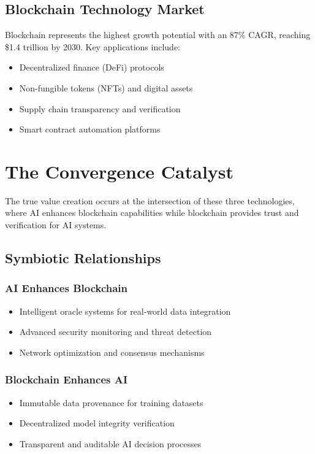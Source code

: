 \documentclass[11pt,a4paper]{report}
\begin{document}
\section{Blockchain Technology Market}

Blockchain represents the highest growth potential with an 87\% CAGR, reaching \$1.4 trillion by 2030. Key applications include:

\begin{itemize}
\item Decentralized finance (DeFi) protocols
\item Non-fungible tokens (NFTs) and digital assets
\item Supply chain transparency and verification
\item Smart contract automation platforms
\end{itemize}

\chapter{The Convergence Catalyst}

The true value creation occurs at the intersection of these three technologies, where AI enhances blockchain capabilities while blockchain provides trust and verification for AI systems.

\section{Symbiotic Relationships}

\subsection{AI Enhances Blockchain}
\begin{itemize}
\item Intelligent oracle systems for real-world data integration
\item Advanced security monitoring and threat detection
\item Network optimization and consensus mechanisms
\end{itemize}

\subsection{Blockchain Enhances AI}
\begin{itemize}
\item Immutable data provenance for training datasets
\item Decentralized model integrity verification
\item Transparent and auditable AI decision processes
\end{itemize}
\end{document}
